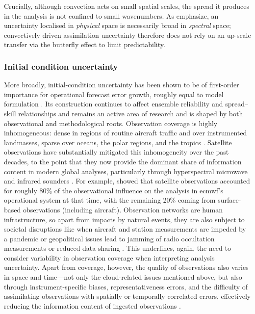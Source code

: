 Crucially, although convection acts on small spatial scales, the
spread it produces in the analysis is not confined to small
wavenumbers. As \textcite{lloverasMesoscalePredictabilityMoist2022}
emphasize, an uncertainty localised in \emph{physical} space is necessarily
broad in \emph{spectral} space; convectively driven assimilation uncertainty
therefore does not rely on an up-scale transfer via the butterfly effect
to limit predictability.

\subsubsection{Initial condition uncertainty}

More broadly, initial-condition uncertainty has been shown to be of
first-order importance for operational forecast error growth, roughly equal
to model formulation \parencite{magnussonDependenceInitialConditions2019}.
Its construction continues to affect ensemble reliability and
spread--skill relationships and remains an active area of research
\parencite{langImpactPerturbationMethods2012,
    raynaudComparisonInitialPerturbation2016,
    wangImpactsMultiscaleComponents2023} and is shaped by
both observational and methodological roots. Observation coverage is
highly inhomogeneous: dense in regions of routine aircraft traffic and
over instrumented landmasses, sparse over oceans, the polar regions, and
the tropics \parencite{sociERA5GlobalReanalysis2024}. Satellite
observations have substantially mitigated this inhomogeneity over the
past decades, to the point that they now provide the dominant share of
information content in modern global analyses, particularly through
hyperspectral microwave and infrared sounders
\parencite{bauerQuietRevolutionNumerical2015}. For example,
\textcite{cardinaliObservationInfluenceDiagnostic2013} showed that
satellite observations accounted for roughly 80\% of the observational
influence on the analysis in \gls{ecmwf}'s operational system at that
time, with the remaining 20\% coming from surface-based observations
(including aircraft). Observation networks are human infrastructure, so apart
from impacts by natural events, they are also subject to
societal disruptions like when aircraft and station measurements are impeded by
a pandemic \parencite{inglebyImpactCOVID19Weather2021,
    ImpactsCOVID19Restrictions2020} or geopolitical issues lead to jamming of
radio occultation measurements \parencite{wuGNSSSignalJamming2024} or reduced
data sharing \parencite{GlobalRadiosondeNetwork2016}. This underlines, again,
the need to consider variability in observation coverage when interpreting
analysis uncertainty.
Apart from coverage, however, the quality of
observations also varies in space and time---not only the cloud-related
issues mentioned above, but also through instrument-specific biases,
representativeness errors, and the difficulty of assimilating observations
with spatially
or temporally correlated errors, effectively reducing the information
content of ingested observations
\parencite{janjicRepresentationErrorData2018}.

